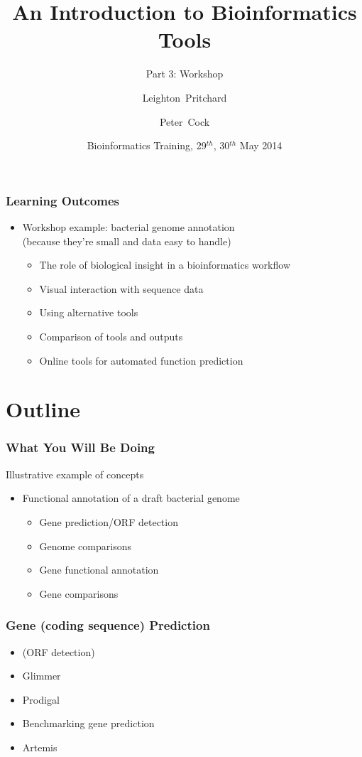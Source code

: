 \documentclass[table]{beamer}
\title[Intro to Bioinformatics] %
{An Introduction to Bioinformatics Tools}
\subtitle{Part 3: Workshop}
\author[Pritchard, Cock] %
{Leighton~Pritchard \and Peter~Cock}
\institute[The James Hutton Institute] %
{
  Information and Computational Sciences\\
  The James Hutton Institute
}
\date[May 2014] %
{Bioinformatics Training, 29$^{th}$, 30$^{th}$ May 2014}
\begin{document}
  \frame[plain]{\titlepage}
 
    \begin{frame}
     \frametitle{Learning Outcomes}
     \begin{itemize}
       \item Workshop example: bacterial genome annotation \\
         (because they're small and data easy to handle)
       \begin{itemize}
         \item The role of biological insight in a bioinformatics workflow
         \item Visual interaction with sequence data
         \item Using alternative tools
         \item Comparison of tools and outputs
         \item Online tools for automated function prediction
       \end{itemize}
     \end{itemize}
    \end{frame} 
  
\section{Outline}

    \begin{frame}
     \frametitle{What You Will Be Doing}
     Illustrative example of concepts
     \begin{itemize}
       \item Functional annotation of a draft bacterial genome
       \begin{itemize}
         \item Gene prediction/ORF detection
         \item Genome comparisons
         \item Gene functional annotation
         \item Gene comparisons
       \end{itemize}
     \end{itemize}
    \end{frame}

    \begin{frame}
     \frametitle{Gene (coding sequence) Prediction}
     \begin{itemize}
       \item (ORF detection)
       \item Glimmer
       \item Prodigal
       \item Benchmarking gene prediction
       \item Artemis
     \end{itemize}
    \end{frame}
    
\end{document}
